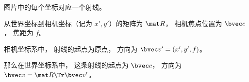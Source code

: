 
\begin{issues}
\issueDraft
\end{issues}


图片中的每个坐标对应一个射线。

从世界坐标到相机坐标（记为 $x', y'$）的矩阵为 $\mat R$， 相机焦点位置为 $\bvec c$， 焦距为 $f$。

相机坐标系中， 射线的起点为原点， 方向为 $\bvec v' = (x', y', f)$。

那么在世界坐标系中， 这条射线的起点为 $\bvec c$， 方向为 $\bvec v = \mat R\Tr \bvec v'$。
